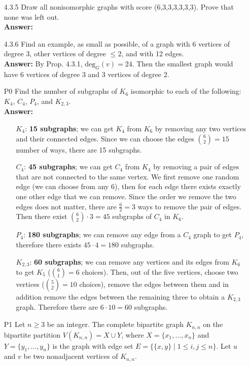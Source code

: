 \documentclass{article}
\begin{document}
\begin{itemize}
    \item [4.3.5] Draw all nonisomorphic graphs with score (6,3,3,3,3,3,3). Prove that none was left out.\\\textbf{Answer: }
    \item [4.3.6] Find an example, as small as possible, of a graph with 6 vertices of degree 3, other vertices of degree $\leq 2$, and with 12 edges.\\\textbf{Answer: } By Prop. 4.3.1, $\text{deg}_G(v)=24$. Then the smallest graph would have 6 vertices of degree 3 and 3 vertices of degree 2.
    \item [P0] Find the number of subgraphs of $K_6$ isomorphic to each of the following: $K_4$, $C_4$, $P_4$, and $K_{2,3}$.\\\textbf{Answer: }\begin{itemize}
              \item [$K_4$:] \textbf{15 subgraphs}; we can get $K_4$ from $K_6$ by removing any two vertices and their connected edges. Since we can choose the edges ${6\choose 2}=15$ number of ways, there are 15 subgraphs.
              \item [$C_4$:] \textbf{45 subgraphs}; we can get $C_4$ from $K_4$ by removing a pair of edges that are not connected to the same vertex. We first remove one random edge (we can choose from any 6), then for each edge there exists exactly one other edge that we can remove. Since the order we remove the two edges does not matter, there are $\frac{6}{2}=3$ ways to remove the pair of edges. Then there exist ${6\choose 2}\cdot 3=45$ subgraphs of $C_4$ in $K_6$.
              \item [$P_4$:] \textbf{180 subgraphs}; we can remove any edge from a $C_4$ graph to get $P_4$, therefore there exists $45\cdot 4=180$ subgraphs.
              \item [$K_{2,3}$:] \textbf{60 subgraphs}; we can remove any vertices and its edges from $K_6$ to get $K_5$ (${6\choose 1}=6$ choices). Then, out of the five vertices, choose two vertices (${5\choose 2}=10$ choices), remove the edges between them and in addition remove the edges between the remaining three to obtain a $K_{2,3}$ graph. Therefore there are $6\cdot 10=60$ subgraphs.
          \end{itemize}
    \item [P1] Let $n\geq 3$ be an integer. The complete bipartite graph $K_{n,n}$ on the bipartite partition $V(K_{n,n})=X\cup Y$, where $X=\{x_1,\ldots,x_n\}$ and $Y=\{y_1,\ldots,y_n\}$ is the graph with edge set $E=\{\{x,y\}\mid 1\leq i,j\leq n\}$. Let $u$ and $v$ be two nonadjacent vertices of $K_{n,n}$.

\end{itemize}
\end{document}
